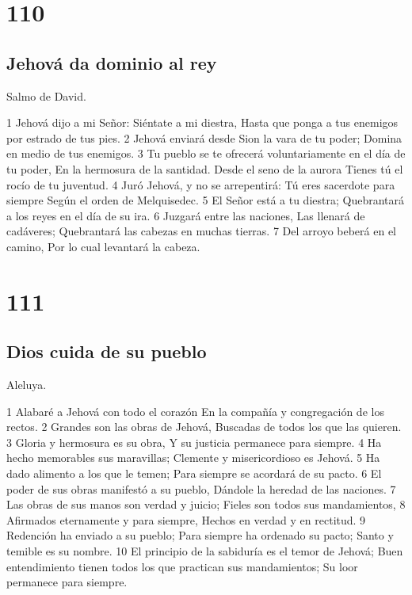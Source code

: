 \chapter{110}

\section*{Jehová da dominio al rey}

Salmo de David.

1 Jehová dijo a mi Señor:
Siéntate a mi diestra,
Hasta que ponga a tus enemigos por estrado de tus pies.
2 Jehová enviará desde Sion la vara de tu poder;
Domina en medio de tus enemigos.
3 Tu pueblo se te ofrecerá voluntariamente en el día de tu poder,
En la hermosura de la santidad.
Desde el seno de la aurora
Tienes tú el rocío de tu juventud.
4 Juró Jehová, y no se arrepentirá:
Tú eres sacerdote para siempre
Según el orden de Melquisedec.
5 El Señor está a tu diestra;
Quebrantará a los reyes en el día de su ira.
6 Juzgará entre las naciones,
Las llenará de cadáveres;
Quebrantará las cabezas en muchas tierras.
7 Del arroyo beberá en el camino,
Por lo cual levantará la cabeza.

\chapter{111}

\section*{Dios cuida de su pueblo}

Aleluya.

1 Alabaré a Jehová con todo el corazón
En la compañía y congregación de los rectos.
2 Grandes son las obras de Jehová,
Buscadas de todos los que las quieren.
3 Gloria y hermosura es su obra,
Y su justicia permanece para siempre.
4 Ha hecho memorables sus maravillas;
Clemente y misericordioso es Jehová.
5 Ha dado alimento a los que le temen;
Para siempre se acordará de su pacto.
6 El poder de sus obras manifestó a su pueblo,
Dándole la heredad de las naciones.
7 Las obras de sus manos son verdad y juicio;
Fieles son todos sus mandamientos,
8 Afirmados eternamente y para siempre,
Hechos en verdad y en rectitud.
9 Redención ha enviado a su pueblo;
Para siempre ha ordenado su pacto;
Santo y temible es su nombre.
10 El principio de la sabiduría es el temor de Jehová;
Buen entendimiento tienen todos los
que practican sus mandamientos;
Su loor permanece para siempre.

